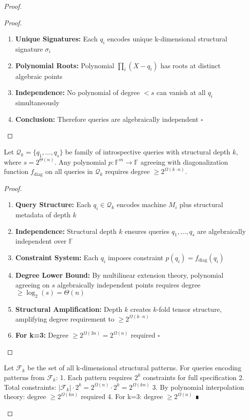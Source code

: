 \documentclass[11pt]{article}
\newcommand{\qed}{\hfill$\square$}
\begin{document}
\begin{proof}
\begin{proof}
\begin{enumerate}
\item \textbf{Unique Signatures:} Each $q_i$ encodes unique k-dimensional structural signature $\sigma_i$
\item \textbf{Polynomial Roots:} Polynomial $\prod_{i} (X - q_i)$ has roots at distinct algebraic points
\item \textbf{Independence:} No polynomial of degree $< s$ can vanish at all $q_i$ simultaneously
\item \textbf{Conclusion:} Therefore queries are algebraically independent \qed
\end{enumerate}
\end{proof}

\begin{lemma}
Let $\mathcal{Q}_k = \{q_1, \ldots, q_s\}$ be family of introspective queries with structural depth $k$, where $s = 2^{\Theta(n)}$. Any polynomial $p: \mathbb{F}^m \to \mathbb{F}$ agreeing with diagonalization function $f_{\text{diag}}$ on all queries in $\mathcal{Q}_k$ requires degree $\geq 2^{\Omega(k \cdot n)}$.
\end{lemma}

\begin{proof}
\begin{enumerate}
\item \textbf{Query Structure:} Each $q_i \in \mathcal{Q}_k$ encodes machine $M_i$ plus structural metadata of depth $k$
\item \textbf{Independence:} Structural depth $k$ ensures queries $q_1, \ldots, q_s$ are algebraically independent over $\mathbb{F}$
\item \textbf{Constraint System:} Each $q_i$ imposes constraint $p(q_i) = f_{\text{diag}}(q_i)$
\item \textbf{Degree Lower Bound:} By multilinear extension theory, polynomial agreeing on $s$ algebraically independent points requires degree $\geq \log_2(s) = \Theta(n)$
\item \textbf{Structural Amplification:} Depth $k$ creates $k$-fold tensor structure, amplifying degree requirement to $\geq 2^{\Omega(k \cdot n)}$
\item \textbf{For k=3:} Degree $\geq 2^{\Omega(3n)} = 2^{\Omega(n)}$ required \qed
\end{enumerate}
\end{proof}

\begin{lemma}
Let $\mathcal{F}_k$ be the set of all k-dimensional structural patterns.
For queries encoding patterns from $\mathcal{F}_k$:
1. Each pattern requires $2^k$ constraints for full specification
2. Total constraints: $|\mathcal{F}_k| \cdot 2^k = 2^{\Omega(n)} \cdot 2^k = 2^{\Omega(kn)}$
3. By polynomial interpolation theory: degree $\geq 2^{\Omega(kn)}$ required
4. For k=3: degree $\geq 2^{\Omega(n)}$ ∎
\end{lemma}


\end{proof}
\end{document}
